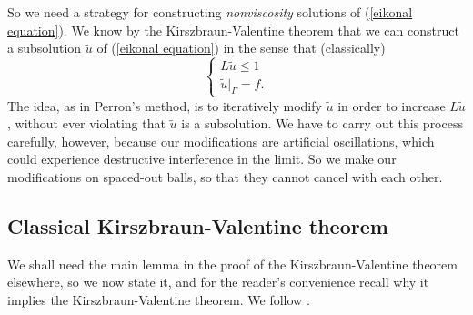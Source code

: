 \documentclass[reqno,11pt]{amsart}
\theoremstyle{definition}
\numberwithin{equation}{section}
\begin{document}
So we need a strategy for constructing \emph{nonviscosity} solutions of (\ref{eikonal equation}).
We know by the Kirszbraun-Valentine theorem that we can construct a subsolution $\tilde u$ of (\ref{eikonal equation}) in the sense that (classically)
$$\begin{cases}
L\tilde u \leq 1 \\
\tilde u|_\Gamma = f.
\end{cases}$$
The idea, as in Perron's method, is to iteratively modify $\tilde u$ in order to increase $L \tilde u$, without ever violating that $\tilde u$ is a subsolution.
We have to carry out this process carefully, however, because our modifications are artificial oscillations, which could experience destructive interference in the limit.
So we make our modifications on spaced-out balls, so that they cannot cancel with each other.

\subsection{Classical Kirszbraun-Valentine theorem}
We shall need the main lemma in the proof of the Kirszbraun-Valentine theorem elsewhere, so we now state it, and for the reader's convenience recall why it implies the Kirszbraun-Valentine theorem.
We follow \cite[\S3.1]{Kassel17}.
\end{document}
